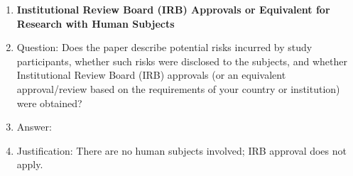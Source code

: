 \begin{enumerate}
\item {\bf Institutional Review Board (IRB) Approvals or Equivalent for Research with Human Subjects}
    \item[] Question: Does the paper describe potential risks incurred by study participants, whether such risks were disclosed to the subjects, and whether Institutional Review Board (IRB) approvals (or an equivalent approval/review based on the requirements of your country or institution) were obtained?
    \item[] Answer: \answerNA{}
    \item[] Justification: There are no human subjects involved; IRB approval does not apply. 

\end{enumerate}